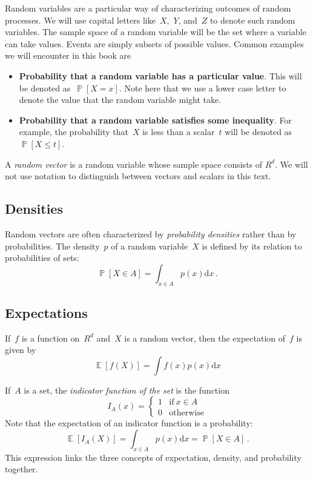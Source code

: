 \documentclass{tufte-book}
\begin{document}
Random variables are a particular way of characterizing outcomes of
random processes. We will use capital letters like~\(X\),~\(Y\),
and~\(Z\) to denote such random variables. The sample space of a random
variable will be the set where a variable can take values. Events are
simply subsets of possible values. Common examples we will encounter in
this book are

\begin{itemize}
\item
  \textbf{Probability that a random variable has a particular value}.
  This will be denoted as~\(\mathop\mathbb{P}[X=x]\). Note here that we
  use a lower case letter to denote the value that the random variable
  might take.
\item
  \textbf{Probability that a random variable satisfies some inequality}.
  For example, the probability that~\(X\) is less than a scalar~\(t\)
  will be denoted as~\(\mathop\mathbb{P}[X\leq t]\).
\end{itemize}

A \emph{random vector} is a random variable whose sample space consists
of \(R^d\). We will not use notation to distinguish between vectors and
scalars in this text.

\hypertarget{densities}{%
\subsection{Densities}\label{densities}}

Random vectors are often characterized by \emph{probability
densities} rather than by probabilities. The
density~\(p\) of a random variable~\(X\) is defined by its relation to
probabilities of sets: \[
  \mathop\mathbb{P}[X \in A] = \int_{x\in A} p(x) \mathrm{d} x\,.
\]

\hypertarget{expectations}{%
\subsection{Expectations}\label{expectations}}

If~\(f\) is a function on~\(R^d\) and~\(X\) is a random vector, then the
expectation of~\(f\) is given by \[
  \mathop\mathbb{E}[f(X)] = \int f(x) p(x) \mathrm{d} x
\]

If~\(A\) is a set, the \emph{indicator function of the set} is the
function \[
  I_A(x) = \begin{cases} 1 & \text{if}~x \in A \\ 0 & \text{otherwise} \end{cases}
\] Note that the expectation of an indicator function is a probability:
\[
  \mathop\mathbb{E}[I_A(X)] = \int_{x \in A} p(x) \mathrm{d} x = \mathop\mathbb{P}[X \in A]\,.
\] This expression links the three concepts of expectation, density, and
probability together.
\end{document}
